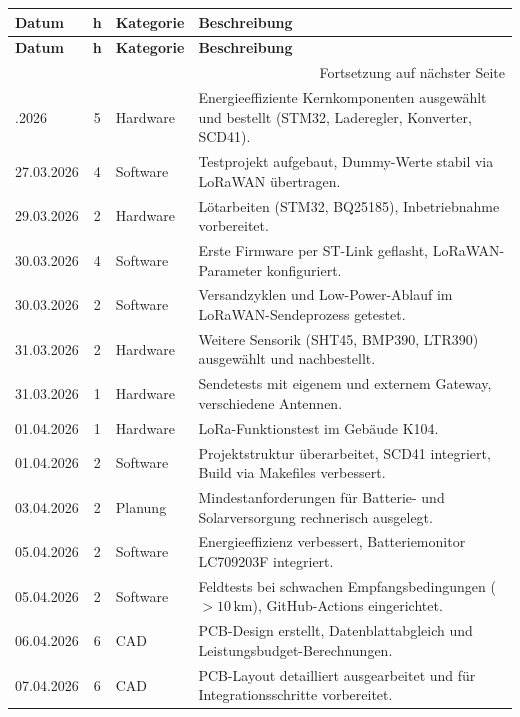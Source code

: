 \documentclass[11pt,a4paper]{scrartcl}
\begin{document}
\small
\setlength{\LTleft}{0pt}
\setlength{\LTright}{0pt}
\begin{longtable}{|l|c|l|p{7cm}|}
\hline
\textbf{Datum} & \textbf{h} & \textbf{Kategorie} & \textbf{Beschreibung} \\
\hline
\endfirsthead
\hline
\textbf{Datum} & \textbf{h} & \textbf{Kategorie} & \textbf{Beschreibung} \\
\hline
\endhead
\hline
\multicolumn{4}{|r|}{\footnotesize Fortsetzung auf nächster Seite} \\
\hline
\endfoot
\hline
\endlastfoot
23.03.2026 & 5 & Hardware  & Energieeffiziente Kernkomponenten ausgewählt und bestellt (STM32, Laderegler, Konverter, SCD41). \\ \hline
27.03.2026 & 4 & Software  & Testprojekt aufgebaut, Dummy-Werte stabil via LoRaWAN übertragen. \\ \hline
29.03.2026 & 2 & Hardware  & Lötarbeiten (STM32, BQ25185), Inbetriebnahme vorbereitet. \\ \hline
30.03.2026 & 4 & Software  & Erste Firmware per ST-Link geflasht, LoRaWAN-Parameter konfiguriert. \\ \hline
30.03.2026 & 2 & Software  & Versandzyklen und Low-Power-Ablauf im LoRaWAN-Sendeprozess getestet. \\ \hline
31.03.2026 & 2 & Hardware  & Weitere Sensorik (SHT45, BMP390, LTR390) ausgewählt und nachbestellt. \\ \hline
31.03.2026 & 1 & Hardware  & Sendetests mit eigenem und externem Gateway, verschiedene Antennen. \\ \hline
01.04.2026 & 1 & Hardware  & LoRa-Funktionstest im Gebäude K104. \\ \hline
01.04.2026 & 2 & Software  & Projektstruktur überarbeitet, SCD41 integriert, Build via Makefiles verbessert. \\ \hline
03.04.2026 & 2 & Planung   & Mindestanforderungen für Batterie- und Solarversorgung rechnerisch ausgelegt. \\ \hline
05.04.2026 & 2 & Software  & Energieeffizienz verbessert, Batteriemonitor LC709203F integriert. \\ \hline
05.04.2026 & 2 & Software  & Feldtests bei schwachen Empfangsbedingungen ($>10\,\text{km}$), GitHub-Actions eingerichtet. \\ \hline
06.04.2026 & 6 & CAD       & PCB-Design erstellt, Datenblattabgleich und Leistungsbudget-Berechnungen. \\ \hline
07.04.2026 & 6 & CAD       & PCB-Layout detailliert ausgearbeitet und für Integrationsschritte vorbereitet. \\ \hline

\end{longtable}
\end{document}
